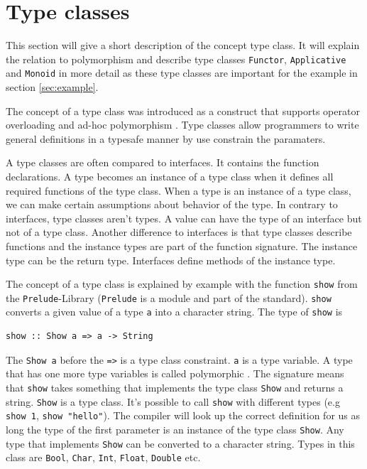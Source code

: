
\section{Type classes}
\label{sec:typeclasses}

This section will give a short description of the concept type class. It will explain the relation to polymorphism and describe type classes \verb|Functor|, \verb|Applicative| and \verb|Monoid| in more detail as these type classes are important for the example in section \ref{sec:example}.

The concept of a type class was introduced as a construct that supports operator overloading and ad-hoc polymorphism \cite{Wadler}. Type classes allow programmers to write general definitions in a typesafe manner by use constrain the paramaters.

A type classes are often compared to interfaces. It contains the function declarations. A type becomes an instance of a type class when it defines all required functions of the type class. When a type is an instance of a type class, we can make certain assumptions about behavior of the type. In contrary to interfaces, type classes aren't types. A value can have the type of an interface but not of a type class. Another difference to interfaces is that type classes describe functions and the instance types are part of the function signature. The instance type can be the return type. Interfaces define methods of the instance type.

The concept of a type class is explained by example with the function \verb|show| from the \verb|Prelude|-Library (\verb|Prelude| is a module and part of the standard). \verb|show| converts a given value of a type \verb|a| into a character string. The type of \verb|show| is

\begin{verbatim}
show :: Show a => a -> String
\end{verbatim}

The \verb|Show a| before the \verb|=>| is a type class constraint. \verb|a| is a type variable. A type that has one more type variables is called polymorphic \cite{hutton}. The signature means that \verb|show| takes something that implements the type class \verb|Show| and returns a string. \verb|Show| is a type class. It's possible to call \verb|show| with different types (e.g \verb|show 1|, \verb|show "hello"|). The compiler will look up the correct definition for us as long the type of the first parameter is an instance of the type class \verb|Show|.  
Any type that implements \verb|Show| can be converted to a character string. Types in this class are \verb|Bool|, \verb|Char|, \verb|Int|, \verb|Float|, \verb|Double| etc.

